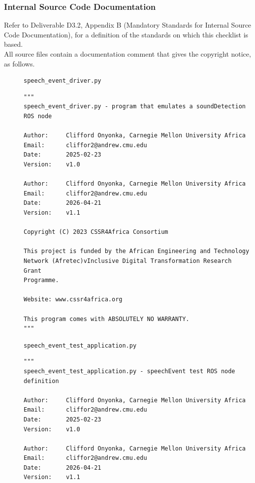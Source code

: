 \documentclass{CSSRforAfrica}
\newcommand{\checkboxChecked}{\fbox{\ding{51}}} %
\begin{document}
 
\subsubsection{Internal Source Code Documentation}
\label{subsubsection:speech_event_test_documentation_standards}  
 
Refer to Deliverable D3.2, Appendix B (Mandatory Standards for Internal Source Code Documentation), for a definition of the standards on which this checklist is based.\\

\noindent All source files contain a documentation comment that gives the copyright notice, as follows.
 
\begin{description}

\item[\checkboxChecked] {\small \verb+speech_event_driver.py+}  
{\small \begin{verbatim}
"""
speech_event_driver.py - program that emulates a soundDetection ROS node

Author:     Clifford Onyonka, Carnegie Mellon University Africa
Email:      cliffor2@andrew.cmu.edu
Date:       2025-02-23
Version:    v1.0

Author:     Clifford Onyonka, Carnegie Mellon University Africa
Email:      cliffor2@andrew.cmu.edu
Date:       2026-04-21
Version:    v1.1

Copyright (C) 2023 CSSR4Africa Consortium

This project is funded by the African Engineering and Technology
Network (Afretec)vInclusive Digital Transformation Research Grant
Programme.

Website: www.cssr4africa.org

This program comes with ABSOLUTELY NO WARRANTY.
"""
\end{verbatim} }

\item[\checkboxChecked] {\small \verb+speech_event_test_application.py+}  
{\small \begin{verbatim}
"""
speech_event_test_application.py - speechEvent test ROS node definition

Author:     Clifford Onyonka, Carnegie Mellon University Africa
Email:      cliffor2@andrew.cmu.edu
Date:       2025-02-23
Version:    v1.0

Author:     Clifford Onyonka, Carnegie Mellon University Africa
Email:      cliffor2@andrew.cmu.edu
Date:       2026-04-21
Version:    v1.1


\end{verbatim}}
\end{description}
\end{document}
